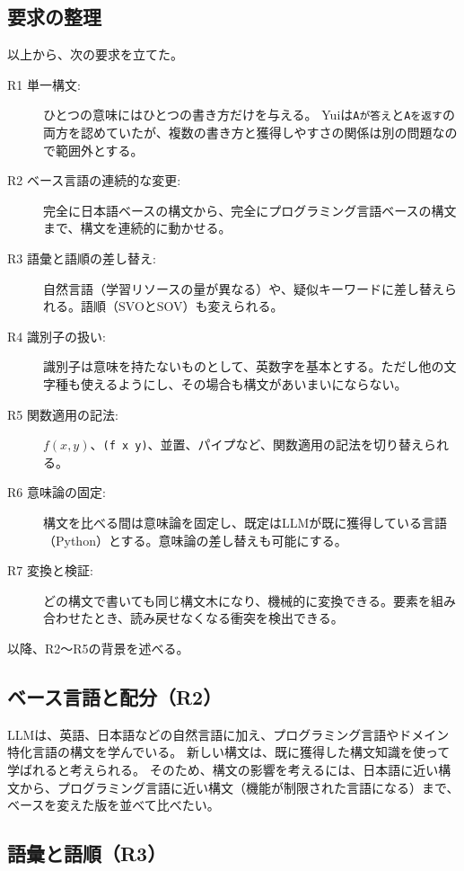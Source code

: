\documentclass{ipsjprosym}
\begin{document}
\subsection{要求の整理}

以上から、次の要求を立てた。

\begin{description}
  \item[R1 単一構文:] ひとつの意味にはひとつの書き方だけを与える。
    Yuiは\verb|Aが答え|と\verb|Aを返す|の両方を認めていたが、複数の書き方と獲得しやすさの関係は別の問題なので範囲外とする。
  \item[R2 ベース言語の連続的な変更:] 完全に日本語ベースの構文から、完全にプログラミング言語ベースの構文まで、構文を連続的に動かせる。
  \item[R3 語彙と語順の差し替え:] 自然言語（学習リソースの量が異なる）や、疑似キーワードに差し替えられる。語順（SVOとSOV）も変えられる。
  \item[R4 識別子の扱い:] 識別子は意味を持たないものとして、英数字を基本とする。ただし他の文字種も使えるようにし、その場合も構文があいまいにならない。
  \item[R5 関数適用の記法:] $f(x, y)$、\verb|(f x y)|、並置、パイプなど、関数適用の記法を切り替えられる。
  \item[R6 意味論の固定:] 構文を比べる間は意味論を固定し、既定はLLMが既に獲得している言語（Python）とする。意味論の差し替えも可能にする。
  \item[R7 変換と検証:] どの構文で書いても同じ構文木になり、機械的に変換できる。要素を組み合わせたとき、読み戻せなくなる衝突を検出できる。
\end{description}

以降、R2〜R5の背景を述べる。

\subsection{ベース言語と配分（R2）}

LLMは、英語、日本語などの自然言語に加え、プログラミング言語やドメイン特化言語の構文を学んでいる。
新しい構文は、既に獲得した構文知識を使って学ばれると考えられる。
そのため、構文の影響を考えるには、日本語に近い構文から、プログラミング言語に近い構文（機能が制限された言語になる）まで、ベースを変えた版を並べて比べたい。

\subsection{語彙と語順（R3）}
\end{document}
